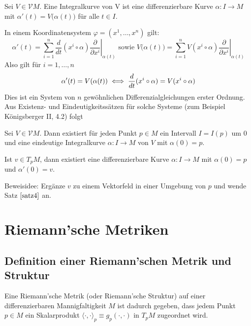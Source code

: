 \documentclass[a4paper,twoside,DIV15,BCOR12mm]{scrbook}
\newcommand{\V}{\mathcal V}
\begin{document}
Sei $V\in \V M $. Eine Integralkurve von V ist eine differenzierbare Kurve $\alpha: I\to M$ mit $\alpha'(t) = V\big(\alpha(t)\big)$ für alle $t\in I$.

In einem Koordinatensystem $\varphi=(x^1,\ldots,x^n)$ gilt:
\[
\alpha'(t) = \sum_{i=1}^n \frac d{dt}(x^i\circ \alpha) \left.\frac\partial{\partial x^i}\right|_{\alpha(t)}
\text{ sowie }
V\big(\alpha(t)\big) = \sum_{i=1}^n V(x^i\circ \alpha) \left.\frac\partial{\partial x^i}\right|_{\alpha(t)}
\]
Also gilt für $i=1,\ldots,n$
\[
\alpha'(t) = V(\alpha(t)) \iff \frac d{dt}(x^i\circ \alpha) = V(x^i\circ\alpha)
\]
Dies ist ein System von $n$ gewöhnlichen Differenzialgleichungen erster Ordnung. Aus Existenz- und Eindeutigkeitssätzen für solche Systeme (zum Beispiel Königsberger II, 4.2) folgt

\begin{satz}
Sei $V\in \V M $. Dann existiert für jeden Punkt $p\in M$ ein Intervall $I=I(p)$ um 0 und eine eindeutige Integralkurve $\alpha : I \to M$ von $V$ mit $\alpha(0) = p$.
\label{satz4}
\end{satz}

\begin{korrolar}
Ist $v\in T_pM$, dann existiert eine differenzierbare Kurve $\alpha: I\to M$ mit $\alpha (0)=p$ und $\alpha'(0)=v$.
\end{korrolar}
Beweisidee: Ergänze $v$ zu einem Vektorfeld in einer Umgebung von $p$ und wende Satz $\ref{satz4}$ an.

\chapter{Riemann’sche Metriken}

\section{Definition einer Riemann’schen Metrik und Struktur}
\newcommand{\asp}{\langle\cdot,\cdot\rangle} %
\newcommand{\ksp}[2]{\langle#1,#2\rangle} %
\newcommand{\lsp}[2]{\left\langle#1,#2\right\rangle} %
\newcommand{\aasp}{\langle\langle\cdot,\cdot\rangle\rangle} %
\newcommand{\kksp}[2]{\langle\langle#1,#2\rangle\rangle} %

Eine Riemann’sche Metrik (oder Riemann’sche Struktur) auf einer differenzierbaren Mannigfaltigkeit $M$ ist dadurch gegeben, dass jedem Punkt $p\in M$ ein Skalarprodukt $\asp_p \equiv g_p(\cdot,\cdot)$ in $T_pM$ zugeordnet wird.
\end{document}
